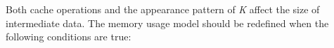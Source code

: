 \begin{comment}
\newtheorem{lemma}{Lemma}
\begin{lemma}[Constant] The memory usage model can be defined as constant (Line I in Figure~\ref{fig:mur}) only when the following conditions are true:
\begin{enumerate}
\item The function API does not distinguish the key, \textit{K};
\item The resulting data will not be cached in memory.
\end{enumerate}
\end{lemma}

\begin{lemma}[Sub-Linear] The memory usage model can be defined as sub-linear (Line II in Figure~\ref{fig:mur}) only when the following conditions are true:
\begin{enumerate}
\item The function API distinguishes the key, \textit{K};
\item The function API aggregates the value, \textit{V};
\item \textit{K} appears randomly in the input dataset.
\end{enumerate}
\end{lemma}

Note that the reason why we require that \textit{K} appears randomly is because the size of intermediate data will increase only when the \textit{K} has appeared. If most \textit{K} gathers around some neighbouring records, the size of intermediate data will increase linearly.

\begin{lemma}[Linear] The memory usage model can be defined as linear (Line III in Figure~\ref{fig:mur}) when the following conditions hold:
\begin{enumerate}
\item The function API distinguishes \textit{K};
\item The function API does not aggregate \textit{V}.
\end{enumerate}
\end{lemma}

\end{comment}

Both cache operations and the appearance pattern of \textit{K} affect the size of intermediate data. 
The memory usage model should be redefined when the following conditions are true:

